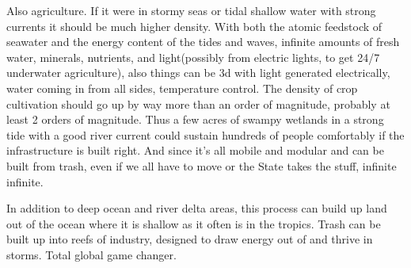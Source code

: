 Also agriculture. If it were in stormy seas or tidal shallow water with
strong currents it should be much higher density. With both the atomic
feedstock of seawater and the energy content of the tides and waves,
infinite amounts of fresh water, minerals, nutrients, and light(possibly
from electric lights, to get 24/7 underwater agriculture), also things
can be 3d with light generated electrically, water coming in from all
sides, temperature control. The density of crop cultivation should go up
by way more than an order of magnitude, probably at least 2 orders of
magnitude. Thus a few acres of swampy wetlands in a strong tide with a
good river current could sustain hundreds of people comfortably if the
infrastructure is built right. And since it's all mobile and modular and
can be built from trash, even if we all have to move or the State takes
the stuff, infinite infinite.

In addition to deep ocean and river delta areas, this process can build
up land out of the ocean where it is shallow as it often is in the
tropics. Trash can be built up into reefs of industry, designed to draw
energy out of and thrive in storms. Total global game changer.
